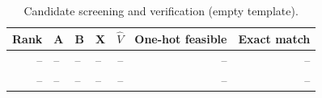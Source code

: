 \begin{table}[htbp]
  \centering\small
  \caption{Candidate screening and verification (empty template).}
  \label{tab:p2_candidates}
  \begin{tabularx}{\linewidth}{@{}R L L L R R R@{}}
    \toprule
    Rank & A & B & X & $\hat V$ & One-hot feasible & Exact match \\
    \midrule
    -- & -- & -- & -- & -- & -- & -- \\
    -- & -- & -- & -- & -- & -- & -- \\
    \bottomrule
  \end{tabularx}
\end{table}
